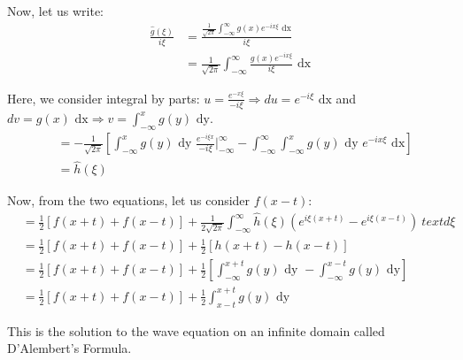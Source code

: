 \begin{enumerate}
  Now, let us write:
  \begin{align}
    \frac{\hat g(\xi)}{i \xi}
    & = \frac{\frac{1}{\sqrt{2\pi}} \int^\infty_{-\infty} g(x)e^{-i x \xi} \text{ dx}}{i \xi}\\
    & = \frac{1}{\sqrt{2 \pi}} \int^\infty_{-\infty} \frac{g(x)e^{-i x \xi} }{i \xi} \text{ dx}
  \end{align}

  Here, we consider integral by parts: $u = \frac{e^{- x \xi}}{- i \xi} \Rightarrow du = e^{- i \xi} \text{ dx}$ and $dv = g(x) \text{ dx} \Rightarrow v = \int^x_{-\infty} g(y) \text{ dy}$.
  \begin{align}
    & = - \frac{1}{\sqrt{2 \pi}}
    \left[
    \int^x_{-\infty} g(y) \text{ dy } \frac{e^{-i \xi x}}{- i \xi} \Big|^\infty_{-\infty} - \int^\infty_{-\infty} \int^x_{-\infty} g(y) \text{ dy } e^{-i x \xi} \text{ dx}
    \right]\\
    & = \hat h(\xi)
  \end{align}

  Now, from the two equations, let us consider $f(x - t)$:
  \begin{align}
    & = \frac{1}{2} \left[ f(x + t) + f(x - t) \right] + \frac{1}{2 \sqrt{2 \pi}} \int^\infty_{-\infty} \hat h(\xi) \left( e^{i \xi(x + t)} - e^{i \xi(x - t)} \right)\ text{ d}\xi\\
    & = \frac{1}{2} \left[ f(x + t) + f(x - t) \right] + \frac{1}{2} \left[ h(x + t) - h(x - t)\right]\\
    & = \frac{1}{2} \left[ f(x + t) + f(x - t) \right]
    + \frac{1}{2} \left[ \int^{x + t}_{- \infty} g(y) \text{ dy } - \int^{x - t}_{-\infty} g(y) \text{ dy} \right]\\
    & = \frac{1}{2} \left[ f(x + t) + f(x - t) \right]
    + \frac{1}{2} \int^{x + t}_{x - t} g(y) \text{ dy}
  \end{align}

  This is the solution to the wave equation on an infinite domain called D'Alembert's Formula.
\end{enumerate}

\hrulefill
